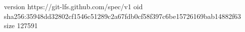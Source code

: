 version https://git-lfs.github.com/spec/v1
oid sha256:35948dd32802cf1546c51289c2a67fdb0cf58f397c6be15726169bab14882f63
size 127591
